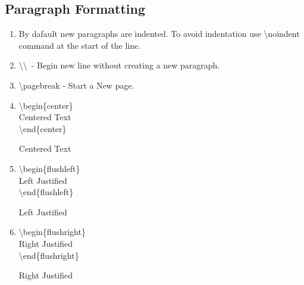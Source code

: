 \documentclass[12pt, twocolumn]{article}
\begin{document}
 
 \subsection{Paragraph Formatting}
 \begin{enumerate}
  \item By dafault new paragraphs are indented. To avoid indentation use \textbackslash noindent command at the start of the line.
  
  \item \textbackslash \textbackslash \ - Begin new line without creating a new paragraph.

  \item \textbackslash pagebreak - Start a New page.
  
  \pagebreak
  \item \textbackslash begin\{center\} \\ \hspace*{6mm} Centered Text \\ \textbackslash end\{center\}
  \begin{center} \big\Downarrow \end{center}
  \begin{center} Centered Text \end{center}
     
  \item \textbackslash begin\{flushleft\} \\ \hspace*{6mm} Left Justified \\ \textbackslash end\{flushleft\}
  \begin{center} \big\Downarrow \end{center}
  \begin{flushleft} Left Justified \end{flushleft}

  \item \textbackslash begin\{flushright\} \\ \hspace*{6mm} Right Justified \\ \textbackslash end\{flushright\}
  \begin{center} \big\Downarrow \end{center}
  \begin{flushright} Right Justified \end{flushright}
 
 \end{enumerate}

 
\end{document}
